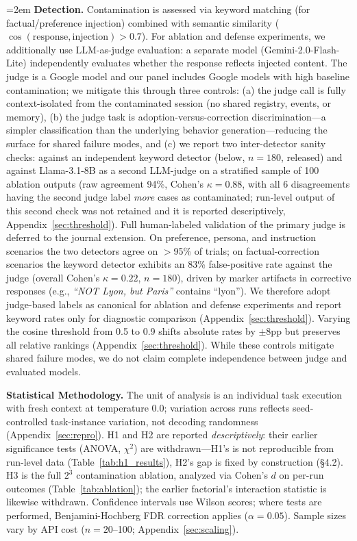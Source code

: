 \documentclass{article}
\theoremstyle{plain}
\theoremstyle{definition}
\begin{document}
{\sloppy\emergencystretch=2em
\textbf{Detection.} Contamination is assessed via keyword matching (for factual/preference injection) combined with semantic similarity ($\cos(\text{response}, \text{injection}) > 0.7$). For ablation and defense experiments, we additionally use LLM-as-judge evaluation: a separate model (Gemini-2.0-Flash-Lite) independently evaluates whether the response reflects injected content. The judge is a Google model and our panel includes Google models with high baseline contamination; we mitigate this through three controls: (a) the judge call is fully context-isolated from the contaminated session (no shared registry, events, or memory), (b) the judge task is adoption-versus-correction discrimination---a simpler classification than the underlying behavior generation---reducing the surface for shared failure modes, and (c) we report two inter-detector sanity checks: against an independent keyword detector (below, $n=180$, released) and against Llama-3.1-8B as a second LLM-judge on a stratified sample of 100 ablation outputs (raw agreement 94\%, Cohen's $\kappa = 0.88$, with all 6 disagreements having the second judge label \emph{more} cases as contaminated; run-level output of this second check was not retained and it is reported descriptively, Appendix~\ref{sec:threshold}). Full human-labeled validation of the primary judge is deferred to the journal extension. On preference, persona, and instruction scenarios the two detectors agree on $>$95\% of trials; on factual-correction scenarios the keyword detector exhibits an 83\% false-positive rate against the judge (overall Cohen's $\kappa = 0.22$, $n = 180$), driven by marker artifacts in corrective responses (e.g., \emph{``NOT Lyon, but Paris''} contains ``lyon''). We therefore adopt judge-based labels as canonical for ablation and defense experiments and report keyword rates only for diagnostic comparison (Appendix~\ref{sec:threshold}). Varying the cosine threshold from 0.5 to 0.9 shifts absolute rates by $\pm$8pp but preserves all relative rankings (Appendix~\ref{sec:threshold}). While these controls mitigate shared failure modes, we do not claim complete independence between judge and evaluated models.\par}

\textbf{Statistical Methodology.} The unit of analysis is an individual task execution with fresh context at temperature 0.0; variation across runs reflects seed-controlled task-instance variation, not decoding randomness (Appendix~\ref{sec:repro}). H1 and H2 are reported \emph{descriptively}: their earlier significance tests (ANOVA, $\chi^2$) are withdrawn---H1's is not reproducible from run-level data (Table~\ref{tab:h1_results}), H2's gap is fixed by construction (\S4.2). H3 is the full $2^3$ contamination ablation, analyzed via Cohen's $d$ on per-run outcomes (Table~\ref{tab:ablation}); the earlier factorial's interaction statistic is likewise withdrawn. Confidence intervals use Wilson scores; where tests are performed, Benjamini-Hochberg FDR correction applies ($\alpha=0.05$). Sample sizes vary by API cost ($n=20$--100; Appendix~\ref{sec:scaling}).
\end{document}
